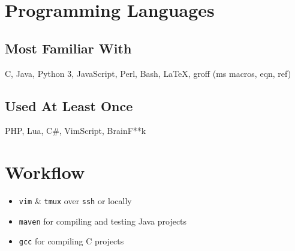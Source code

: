 \documentclass[9pt]{extarticle}
\begin{document}
    \section{Programming Languages}
    \subsection{Most Familiar With}
    C, Java, Python 3, JavaScript, Perl, Bash, \LaTeX, groff (ms macros, eqn, ref)
    \subsection{Used At Least Once}
    PHP, Lua, C\#, VimScript, BrainF**k
    \section{Workflow}
    \begin{itemize}
        \item \texttt{vim} \& \texttt{tmux} over \texttt{ssh} or locally
        \item \texttt{maven} for compiling and testing Java projects
        \item \texttt{gcc} for compiling C projects
    \end{itemize}
\end{document}
